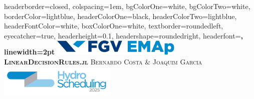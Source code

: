 \documentclass[a0paper,fontscale=0.285]{baposter} %
\begin{document}
\begin{poster}
{
headerborder=closed, %
colspacing=1em, %
bgColorOne=white, %
bgColorTwo=white, %
borderColor=lightblue, %
headerColorOne=black, %
headerColorTwo=lightblue, %
headerFontColor=white, %
boxColorOne=white, %
textborder=roundedleft, %
eyecatcher=true, %
headerheight=0.1\textheight, %
headershape=roundedright, %
headerfont=\Large\bf\textsc, %
linewidth=2pt %
}
%
{\includegraphics[height=2em]{emap_logo.pdf}} %
{\bf\textsc{LinearDecisionRules.jl}\vspace{0.5em}} %
{\textsc{Bernardo Costa \& Joaquim Garcia}} %
{\includegraphics[height=4em]{logo_hpsc.png}} %


\end{poster}
\end{document}

